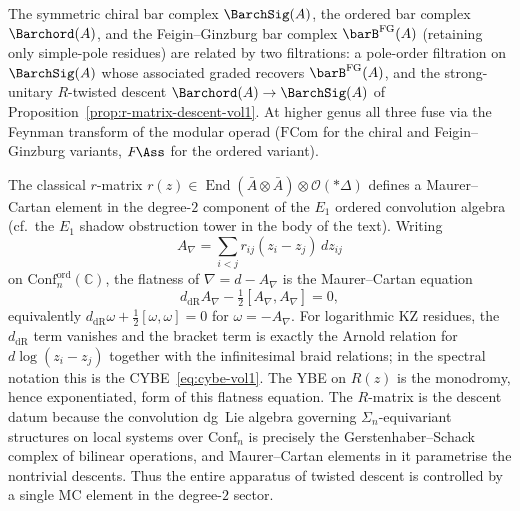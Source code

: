 \begin{remark}
\label{rem:three-bar-variants}%
%
The symmetric chiral bar complex $\BarchSig(A)$, the ordered bar
complex $\Barchord(A)$, and the
Feigin--Ginzburg bar complex $\barB^{\mathrm{FG}}(A)$
(retaining only simple-pole residues) are related by two
filtrations: a pole-order filtration on $\BarchSig(A)$
whose associated graded recovers $\barB^{\mathrm{FG}}(A)$,
and the strong-unitary $R$-twisted descent
$\Barchord(A) \to \BarchSig(A)$ of
Proposition~\ref{prop:r-matrix-descent-vol1}.
At higher genus all three fuse via the Feynman transform
of the modular operad ($\mathrm{FCom}$ for the chiral and
Feigin--Ginzburg variants, $F\!\Ass$ for the ordered variant).
\end{remark}

\begin{remark}
\label{rem:r-matrix-mc-vol1}
The classical $r$-matrix
$r(z)\in\operatorname{End}(\bar A\otimes\bar A)
\otimes\mathcal{O}(*\Delta)$
defines a Maurer--Cartan element in the degree-$2$ component of the
$E_1$ ordered convolution algebra
(cf.\ the $E_1$ shadow obstruction tower in the body of the text).
Writing
\[
A_\nabla=\sum_{i<j}r_{ij}(z_i-z_j)\,dz_{ij}
\]
on $\mathrm{Conf}_n^{\mathrm{ord}}(\mathbb C)$, the flatness of
$\nabla=d-A_\nabla$ is the Maurer--Cartan equation
\[
d_{\mathrm{dR}}A_\nabla-\tfrac{1}{2}[A_\nabla,A_\nabla]=0,
\]
equivalently $d_{\mathrm{dR}}\omega+\tfrac{1}{2}[\omega,\omega]=0$
for $\omega=-A_\nabla$. For logarithmic KZ residues, the
$d_{\mathrm{dR}}$ term vanishes and the bracket term is exactly the
Arnold relation for $d\log(z_i-z_j)$ together with the infinitesimal
braid relations; in the spectral notation this is the
CYBE~\eqref{eq:cybe-vol1}.
The YBE on $R(z)$ is the monodromy, hence exponentiated, form of this
flatness equation. The $R$-matrix is the descent datum because the
convolution dg~Lie algebra governing $\Sigma_n$-equivariant structures
on local systems over $\mathrm{Conf}_n$ is precisely the
Gerstenhaber--Schack complex of bilinear operations, and
Maurer--Cartan elements in it parametrise the nontrivial descents.
Thus the entire apparatus of twisted descent is controlled by a single
MC element in the degree-$2$ sector.
\end{remark}

